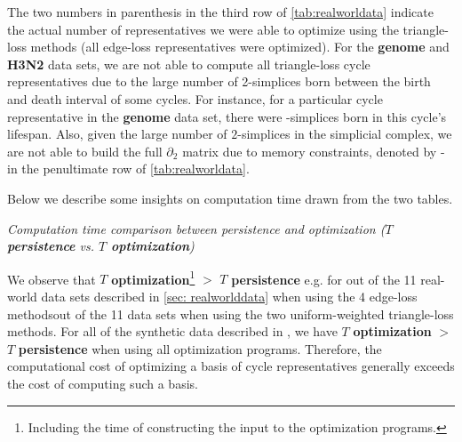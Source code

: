 The two numbers in parenthesis in the third row of \tab \ref{tab:realworldata} indicate the actual number of representatives we were able to optimize using the triangle-loss methods (all edge-loss representatives were optimized). For the \textbf{genome} and \textbf{H3N2} data sets, we are not able to compute all triangle-loss cycle representatives due to the large number of 2-simplices born between the birth and death interval of some cycles. For instance, for a particular cycle representative in the \textbf{genome} data set, there were \DIFdelbegin {}\DIFdelend \DIFaddbegin {}-simplices born in this cycle's lifespan. 
Also, given the large number of $2$-simplices in the simplicial complex, we are not able to build the full $\partial_2$ matrix due to memory constraints, denoted by - in the penultimate row of \tab \ref{tab:realworldata}. 

Below we describe some insights on computation time drawn from the two tables. 

 

\emph{Computation time comparison between persistence and optimization (\textbf{$T$ persistence} vs. \textbf{$T$ optimization})}

We observe that \DIFdelbegin {}\DIFdelend $T$ \textbf{optimization}\footnote{Including the time of constructing the input to the optimization programs.} $>$ $T$ \textbf{persistence} e.g. for \DIFdelbegin {}\DIFdelend \DIFaddbegin {}\DIFaddend out of the 11 real-world data sets described in \se \ref{sec: realworlddata} when using the 4 edge-loss methods\DIFdelbegin {}\DIFdelend \DIFaddbegin {}\DIFaddend out of the 11 data sets when using the two uniform-weighted triangle-loss methods. For all of the synthetic data described in \DIFdelbegin \DIFdel{\se \ref{sec: randompointclouds} }\DIFdelend \DIFaddbegin {}\DIFaddend , we have $T$ \textbf{optimization} $>$ $T$ \textbf{persistence} when using all \DIFdelbegin {}\DIFdelend \DIFaddbegin {}\DIFaddend optimization programs. Therefore, the computational cost of optimizing a basis of cycle representatives generally exceeds the cost of computing such a basis.

